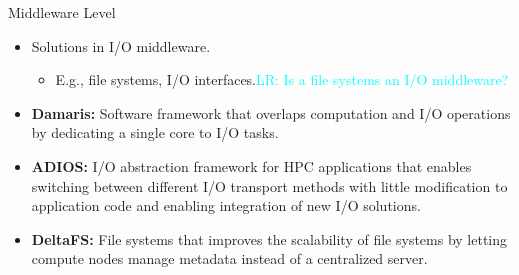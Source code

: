 \documentclass[compress,11pt,xcolor=svgnames,aspectratio=169]{beamer}
\newcommand{\lr}[1]{\textcolor{cyan}{LR: #1}}
\begin{document}
\begin{frame}[fragile] {Middleware Level}

\begin{itemize}
\setlength\itemsep{0.4cm}

\item Solutions in I/O middleware.

    \begin{itemize}

    \item E.g., file systems, I/O interfaces.\lr{Is a file systems an I/O middleware?}

    \end{itemize}

\item \textbf{Damaris:} Software framework that overlaps computation and I/O operations by dedicating a single core to I/O tasks.

\item \textbf{ADIOS:} I/O abstraction framework for HPC applications that enables switching between different I/O transport methods with little modification to application code and enabling integration of new I/O solutions.

\item \textbf{DeltaFS:} File systems that improves the scalability of file systems by letting compute nodes manage metadata instead of a centralized server.

\end{itemize}

\nocite{3372390}

\end{frame}
\end{document}
